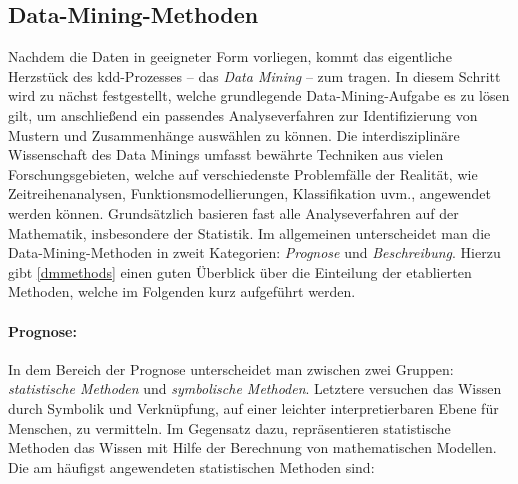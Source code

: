 \subsection{Data-Mining-Methoden}
\label{dmmethoden}

Nachdem die Daten in geeigneter Form vorliegen, kommt das eigentliche Herzstück des \gls{kdd}-Prozesses -- das \textit{Data Mining} -- zum tragen. In diesem Schritt wird zu nächst festgestellt, welche grundlegende Data-Mining-Aufgabe es zu lösen gilt, um anschließend ein passendes Analyseverfahren zur Identifizierung von Mustern und Zusammenhänge auswählen zu können. Die interdisziplinäre Wissenschaft des Data Minings umfasst bewährte Techniken aus vielen Forschungsgebieten, welche auf verschiedenste Problemfälle der Realität, wie Zeitreihenanalysen, Funktionsmodellierungen, Klassifikation uvm., angewendet werden können. Grundsätzlich basieren fast alle Analyseverfahren auf der Mathematik, insbesondere der Statistik. Im allgemeinen unterscheidet man die Data-Mining-Methoden in zweit Kategorien: \textit{Prognose} und \textit{Beschreibung}. Hierzu gibt \vref{dmmethods} einen guten Überblick über die Einteilung der etablierten Methoden, welche im Folgenden kurz aufgeführt werden.

\paragraph{Prognose:} In dem Bereich der Prognose unterscheidet man zwischen zwei Gruppen: \textit{statistische Methoden} und \textit{symbolische Methoden}. Letztere versuchen das Wissen durch Symbolik und Verknüpfung, auf einer leichter interpretierbaren Ebene für Menschen, zu vermitteln. Im Gegensatz dazu, repräsentieren statistische Methoden das Wissen mit Hilfe der Berechnung von mathematischen Modellen. Die am häufigst angewendeten statistischen Methoden sind:


